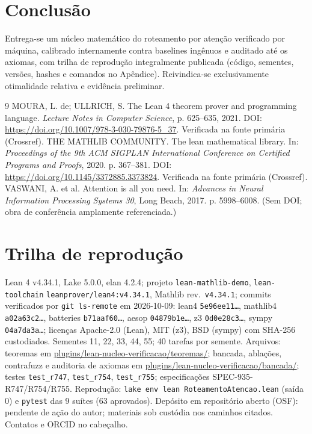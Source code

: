 \documentclass[12pt,a4paper]{article}
\begin{document}
\section{Conclusão}

Entrega-se um núcleo matemático do roteamento por atenção verificado por
máquina, calibrado internamente contra baselines ingênuos e auditado até os
axiomas, com trilha de reprodução integralmente publicada (código, sementes,
versões, hashes e comandos no Apêndice). Reivindica-se exclusivamente
otimalidade relativa e evidência preliminar.

\begin{thebibliography}{9}
 MOURA, L. de; ULLRICH, S. The Lean 4 theorem prover and
programming language. \textit{Lecture Notes in Computer Science}, p. 625--635,
2021. DOI: \url{https://doi.org/10.1007/978-3-030-79876-5_37}.
Verificada na fonte primária (Crossref).
 THE MATHLIB COMMUNITY. The lean mathematical library.
In: \textit{Proceedings of the 9th ACM SIGPLAN International Conference on
Certified Programs and Proofs}, 2020. p. 367--381. DOI:
\url{https://doi.org/10.1145/3372885.3373824}.
Verificada na fonte primária (Crossref).
 VASWANI, A. et al. Attention is all you need. In:
\textit{Advances in Neural Information Processing Systems 30}, Long Beach,
2017. p. 5998--6008. (Sem DOI; obra de conferência amplamente referenciada.)
\end{thebibliography}

\appendix
\sloppy
\section{Trilha de reprodução}

Lean 4 v4.34.1, Lake 5.0.0, elan 4.2.4; projeto \texttt{lean-mathlib-demo},
\texttt{lean-toolchain} \texttt{leanprover/lean4:v4.34.1}, Mathlib rev.\
\texttt{v4.34.1}; commits verificados por \texttt{git ls-remote} em
2026-10-09: lean4 \texttt{5e96ee11\ldots}, mathlib4 \texttt{a02a63c2\ldots},
batteries \texttt{b71aaf60\ldots}, aesop \texttt{04879b1e\ldots},
z3 \texttt{0d0e28c3\ldots}, sympy \texttt{04a7da3a\ldots}; licenças Apache-2.0
(Lean), MIT (z3), BSD (sympy) com SHA-256 custodiados. Sementes 11, 22, 33,
44, 55; 40 tarefas por semente. Arquivos: teoremas em
\url{plugins/lean-nucleo-verificacao/teoremas/}; bancada, ablações,
contrafuzz e auditoria de axiomas em
\url{plugins/lean-nucleo-verificacao/bancada/}; testes
\texttt{test\_r747}, \texttt{test\_r754}, \texttt{test\_r755}; especificações
SPEC-935-R747/R754/R755. Reprodução: \texttt{lake env lean
RoteamentoAtencao.lean} (saída 0) e \texttt{pytest} das 9 suítes (63
aprovados). Depósito em repositório aberto (OSF): pendente de ação do autor;
materiais sob custódia nos caminhos citados. Contatos e ORCID no cabeçalho.
\end{document}
